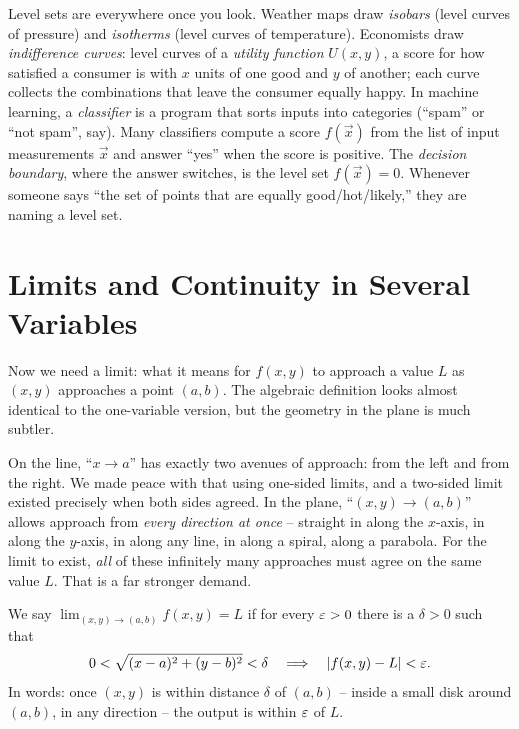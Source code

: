 \begin{applicationbox}
Level sets are everywhere once you look. Weather maps draw \emph{isobars} (level curves of
pressure) and \emph{isotherms} (level curves of temperature). Economists draw
\emph{indifference curves}: level curves of a \emph{utility function} $U(x,y)$, a score for how
satisfied a consumer is with $x$ units of one good and $y$ of another; each curve collects the
combinations that leave the consumer equally happy. In machine learning, a \emph{classifier} is
a program that sorts inputs into categories (``spam'' or ``not spam'', say). Many classifiers
compute a score $f(\vec x)$ from the list of input measurements $\vec x$ and answer ``yes''
when the score is positive. The \emph{decision boundary}, where the answer switches, is the
level set $f(\vec x)=0$. Whenever someone says ``the set of points that are equally good/hot/likely,''
they are naming a level set.
\end{applicationbox}

\section{Limits and Continuity in Several Variables}
\label{ch32:sec-limits}

Now we need a limit: what it means for $f(x,y)$ to approach a value $L$ as $(x,y)$
approaches a point $(a,b)$. The algebraic definition looks almost identical to the one-variable
version, but the geometry in the plane is much subtler.

On the line, ``$x \to a$'' has exactly two avenues of approach: from the left and from the
right. We made peace with that using one-sided limits, and a two-sided limit existed precisely
when both sides agreed. In the plane, ``$(x,y)\to(a,b)$'' allows approach from \emph{every
direction at once} -- straight in along the $x$-axis, in along the $y$-axis, in along any line,
in along a spiral, along a parabola. For the limit to exist, \emph{all} of these infinitely
many approaches must agree on the same value $L$. That is a far stronger demand.

\begin{definition}
\label{ch32:def-limit}
We say $\displaystyle\lim_{(x,y)\to(a,b)} f(x,y) = L$ if for every $\varepsilon>0$ there is a
$\delta>0$ such that
\[
   0 < \sqrt{(x-a)^2 + (y-b)^2} < \delta
   \quad\Longrightarrow\quad
   \lvert f(x,y) - L\rvert < \varepsilon .
\]
In words: once $(x,y)$ is within distance $\delta$ of $(a,b)$ -- inside a small disk around
$(a,b)$, in any direction -- the output is within $\varepsilon$ of $L$.
\end{definition}

